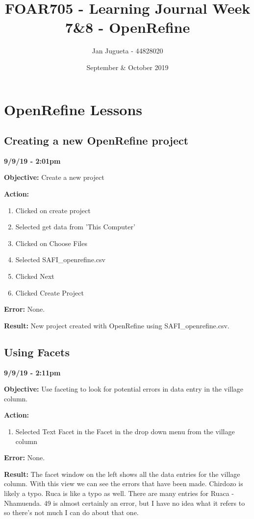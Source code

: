 \documentclass{article}
\title{FOAR705 - Learning Journal Week 7\&8 - OpenRefine}
\author{Jan Jugueta - 44828020}
\date{September \& October 2019}
\begin{document}
\maketitle

\tableofcontents

\newpage
\section{OpenRefine Lessons}

\subsection{Creating a new OpenRefine project}

\textbf{9/9/19 - 2:01pm}

\textbf{Objective:} Create a new project

\textbf{Action:}

\begin{enumerate}
    \item Clicked on create project
    \item Selected get data from 'This Computer'
    \item Clicked on Choose Files
    \item Selected SAFI\_openrefine.csv
    \item Clicked Next
    \item Clicked Create Project
\end{enumerate}

\textbf{Error:} None.

\textbf{Result:} New project created with OpenRefine using SAFI\_openrefine.csv.

\subsection{Using Facets}

\textbf{9/9/19 - 2:11pm}

\textbf{Objective:} Use faceting to look for potential errors in data entry in the village column.

\textbf{Action:}

\begin{enumerate}
    \item Selected Text Facet in the Facet in the drop down menu from the village column
\end{enumerate}

\textbf{Error:} None.

\textbf{Result:} The facet window on the left shows all the data entries for the village column. With this view we can see the errors that have been made. Chirdozo is likely a typo. Ruca is like a typo as well. There are many entries for Ruaca - Nhamuenda. 49 is almost certainly an error, but I have no idea what it refers to so there's not much I can do about that one.
\end{document}
